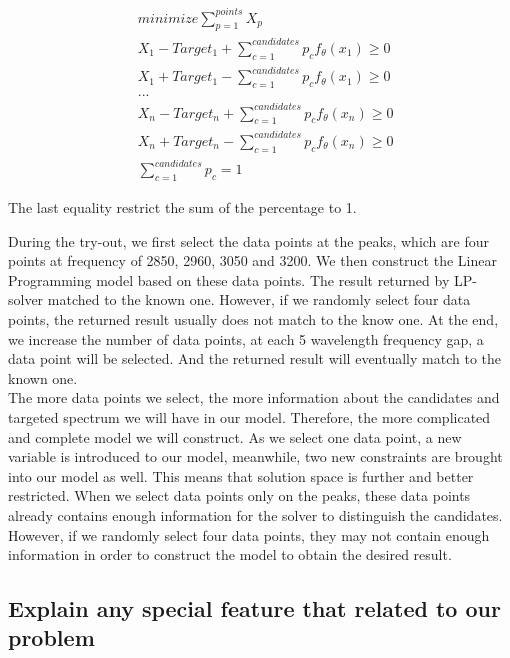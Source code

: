 \begin{eqnarray} 
& minimize \displaystyle\sum^{points}_{p=1} X_p \nonumber \\
& X_1 - Target_1 + \displaystyle\sum^{candidates}_{c=1}p_{c}f_{\theta}(x_1) \geq 0 \nonumber \\
& X_1 + Target_1 - \displaystyle\sum^{candidates}_{c=1}p_{c}f_{\theta}(x_1) \geq 0 \nonumber \\
& ... \nonumber \\
& X_n - Target_n + \displaystyle\sum^{candidates}_{c=1}p_{c}f_{\theta}(x_n) \geq 0 \nonumber \\
& X_n + Target_n - \displaystyle\sum^{candidates}_{c=1}p_{c}f_{\theta}(x_n) \geq 0 \nonumber \\
& \displaystyle\sum^{candidates}_{c=1}p_{c} = 1 \nonumber
\end{eqnarray} 

The last equality restrict the sum of the percentage to 1.

During the try-out, we first select the data points at the peaks, which are four points at frequency of 2850, 2960, 3050 and 3200. We then construct the Linear Programming model based on these data points. The result returned by LP-solver matched to the known one. However, if we randomly select four data points, the returned result usually does not match to the know one. At the end, we increase the number of data points, at each 5 wavelength frequency gap, a data point will be selected. And the returned result will eventually match to the known one. \\

The more data points we select, the more information about the candidates and targeted spectrum we will have in our model. Therefore, the more complicated and complete model we will construct. As we select one data point, a new variable is introduced to our model, meanwhile, two new constraints are brought into our model as well. This means that solution space is further and better restricted. When we select data points only on the peaks, these data points already contains enough information for the solver to distinguish the candidates. However, if we randomly select four data points, they may not contain enough information in order to construct the model to obtain the desired result. 

  




		
\subsection{Explain any special feature that related to our problem} 
		 




%
